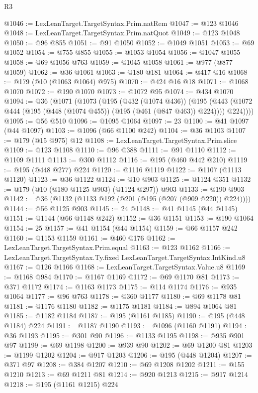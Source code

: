 \begin{lexlean}{R3}
\begin{coremodule}
@1046 := LexLeanTarget.TargetSyntax.Prim.natRem
@1047 := @123 @1046
@1048 := LexLeanTarget.TargetSyntax.Prim.natQuot
@1049 := @123 @1048
@1050 := @96 @855
@1051 := @91 @1050
@1052 := @1049 @1051
@1053 := @69 @1052
@1054 := @755 @855
@1055 := @1053 @1054
@1056 := @1047 @1055
@1058 := @69 @1056 @763
@1059 := @1045 @1058
@1061 := @977 (@877 @1059)
@1062 := @36 @1061
@1063 := @180 @181
@1064 := @417 @16
@1068 := @179 (@10 (@1063 @1064) @975)
@1070 := @424 @16 @18
@1071 := @1068 @1070
@1072 := @190 @1070
@1073 := @1072 @95
@1074 := @434 @1070
@1094 := @36
    (@1071
      (@1073
        (@195
          (@432 (@1074 @436))
          (@195
            (@443 (@1072 @444 (@195 (@448 (@1074 @455)) (@195 (@461 (@847 @463)) @224))))
            @224))))
@1095 := @56 @510
@1096 := @1095 @1064
@1097 := 23
@1100 := @41 @1097 (@44 @1097)
@1103 := @1096 (@66 @1100 @242)
@1104 := @36 @1103
@1107 := @179 (@15 @975) @12
@1108 := LexLeanTarget.TargetSyntax.Prim.slice
@1109 := @123 @1108
@1110 := @96 @388
@1111 := @91 @1110
@1112 := @1109 @1111
@1113 := @300 @1112
@1116 := @195 (@460 @442 @210)
@1119 := @195 (@448 @277) @224
@1120 := @1116 @1119
@1122 := @1107 (@1113 @1120)
@1123 := @36 @1122
@1124 := @10 @903
@1125 := @1124 @351
@1132 := @179 (@10 (@180 @1125 @903) (@1124 @297)) @903
@1133 := @190 @903
@1142 := @36 (@1132 (@1133 @192 (@201 (@195 (@207 (@909 @220)) @224))))
@1144 := @56 @1125 @903
@1145 := 24
@1148 := @41 @1145 (@44 @1145)
@1151 := @1144 (@66 @1148 @242)
@1152 := @36 @1151
@1153 := @190 @1064
@1154 := 25
@1157 := @41 @1154 (@44 @1154)
@1159 := @66 @1157 @242
@1160 := @1153 @1159
@1161 := @460 @176
@1162 := LexLeanTarget.TargetSyntax.Prim.equal
@1163 := @123 @1162
@1166 := LexLeanTarget.TargetSyntax.Ty.fixed LexLeanTarget.TargetSyntax.IntKind.u8
@1167 := @126 @1166
@1168 := LexLeanTarget.TargetSyntax.Value.u8
@1169 := @1168 @984
@1170 := @1167 @1169
@1172 := @69 @1170 @81
@1173 := @371 @1172
@1174 := @1163 @1173
@1175 := @114 @1174
@1176 := @935 @1064
@1177 := @96 @763
@1178 := @360 @1177
@1180 := @69 @1178 @81
@1181 := @1176 @1180
@1182 := @1175 @1181
@1184 := @894 @1064 @81
@1185 := @1182 @1184
@1187 := @195 (@1161 @1185)
@1190 := @195 (@448 @1184) @224
@1191 := @1187 @1190
@1193 := @1096 (@1160 @1191)
@1194 := @36 @1193
@1195 := @301 @90
@1196 := @1133 @1195
@1198 := @935 @901 @97
@1199 := @69 @1198
@1200 := @939 @90
@1202 := @69 @1200 @81
@1203 := @1199 @1202
@1204 := @917 @1203
@1206 := @195 (@448 @1204)
@1207 := @371 @97
@1208 := @384 @1207
@1210 := @69 @1208 @1202
@1211 := @155 @1210
@1213 := @69 @1211 @81
@1214 := @920 @1213
@1215 := @917 @1214
@1218 := @195 (@1161 @1215) @224

\end{coremodule}
\end{lexlean}
